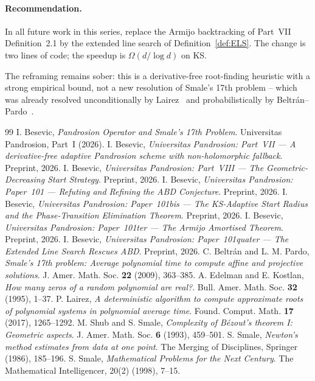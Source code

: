 \documentclass[11pt,a4paper]{article}
\begin{document}
\paragraph{Recommendation.} In all future work in this series, replace the Armijo backtracking of Part~VII Definition~2.1 by the extended line search of Definition~\ref{def:ELS}. The change is two lines of code; the speedup is $\Omega(d / \log d)$ on KS.

The reframing remains sober: this is a derivative-free root-finding heuristic with a strong empirical bound, not a new resolution of Smale's 17th problem -- which was already resolved unconditionally by Lairez~\cite{lairez} and probabilistically by Beltr\'an--Pardo~\cite{beltranpardo}.

\begin{thebibliography}{99}
 I. Besevic, \textit{Pandrosion Operator and Smale's 17th Problem}. Universitas Pandrosion, Part~I (2026).
 I. Besevic, \textit{Universitas Pandrosion: Part~VII --- A derivative-free adaptive Pandrosion scheme with non-holomorphic fallback}. Preprint, 2026.
 I. Besevic, \textit{Universitas Pandrosion: Part~VIII --- The Geometric-Decreasing Start Strategy}. Preprint, 2026.
 I. Besevic, \textit{Universitas Pandrosion: Paper~101 --- Refuting and Refining the ABD Conjecture}. Preprint, 2026.
 I. Besevic, \textit{Universitas Pandrosion: Paper~101bis --- The KS-Adaptive Start Radius and the Phase-Transition Elimination Theorem}. Preprint, 2026.
 I. Besevic, \textit{Universitas Pandrosion: Paper~101ter --- The Armijo Amortised Theorem}. Preprint, 2026.
 I. Besevic, \textit{Universitas Pandrosion: Paper~101quater --- The Extended Line Search Rescues ABD}. Preprint, 2026.
 C. Beltr\'an and L. M. Pardo, \textit{Smale's 17th problem: Average polynomial time to compute affine and projective solutions}. J. Amer. Math. Soc. \textbf{22} (2009), 363--385.
 A. Edelman and E. Kostlan, \textit{How many zeros of a random polynomial are real?}. Bull. Amer. Math. Soc. \textbf{32} (1995), 1--37.
 P. Lairez, \textit{A deterministic algorithm to compute approximate roots of polynomial systems in polynomial average time}. Found. Comput. Math. \textbf{17} (2017), 1265--1292.
 M. Shub and S. Smale, \textit{Complexity of B\'ezout's theorem I: Geometric aspects}. J. Amer. Math. Soc. \textbf{6} (1993), 459--501.
 S. Smale, \textit{Newton's method estimates from data at one point}. The Merging of Disciplines, Springer (1986), 185--196.
 S. Smale, \textit{Mathematical Problems for the Next Century}. The Mathematical Intelligencer, 20(2) (1998), 7--15.
\end{thebibliography}
\end{document}
